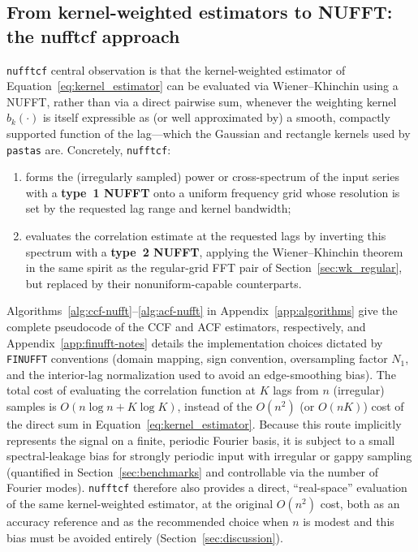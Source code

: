 \documentclass[twocolumn,10pt]{article}
\newcommand{\nufftcf}{\texttt{nufftcf}\xspace}
\newcommand{\pastas}{\texttt{pastas}\xspace}
\begin{document}
\subsection{From kernel-weighted estimators to NUFFT: the nufftcf approach}
\label{sec:nufftcf_approach}
%
\nufftcf central observation is that the kernel-weighted
estimator of Equation~\ref{eq:kernel_estimator} can be evaluated via
Wiener--Khinchin using a NUFFT, rather than via a direct pairwise sum,
whenever the weighting kernel $b_k(\cdot)$ is itself expressible as (or well
approximated by) a smooth, compactly supported function of the
lag---which the Gaussian and rectangle kernels used by \pastas
are. Concretely, \nufftcf:
\begin{enumerate}
    \item forms the (irregularly sampled) power or cross-spectrum of the
    input series with a \textbf{type~1 NUFFT} onto a uniform frequency
    grid whose resolution is set by the requested lag range and kernel
    bandwidth;
    \item evaluates the correlation estimate at the requested lags by
    inverting this spectrum with a \textbf{type~2 NUFFT}, applying the
    Wiener--Khinchin theorem in the same spirit as the regular-grid FFT
    pair of Section~\ref{sec:wk_regular}, but replaced by
    their nonuniform-capable counterparts.
\end{enumerate}
Algorithms~\ref{alg:ccf-nufft}--\ref{alg:acf-nufft} in
Appendix~\ref{app:algorithms} give the complete pseudocode of the CCF and
ACF estimators, respectively, and Appendix~\ref{app:finufft-notes}
details the implementation choices dictated by \texttt{FINUFFT}
conventions (domain mapping, sign convention, oversampling factor $N_1$,
and the interior-lag normalization used to avoid an edge-smoothing
bias). The total cost of evaluating the correlation function at $K$
lags from $n$ (irregular) samples is $O(n\log n + K\log K)$, instead of
the $O(n^2)$ (or $O(nK)$) cost of the direct sum in
Equation~\ref{eq:kernel_estimator}. Because this route implicitly
represents the signal on a finite, periodic Fourier basis, it is subject
to a small spectral-leakage bias for strongly periodic input with
irregular or gappy sampling (quantified in
Section~\ref{sec:benchmarks} and controllable via the number of Fourier
modes). \nufftcf therefore also provides a direct, ``real-space''
evaluation of the same kernel-weighted estimator, at the original
$O(n^2)$ cost, both as an accuracy reference and as the recommended
choice when $n$ is modest and this bias must be avoided entirely
(Section~\ref{sec:discussion}).
\end{document}
